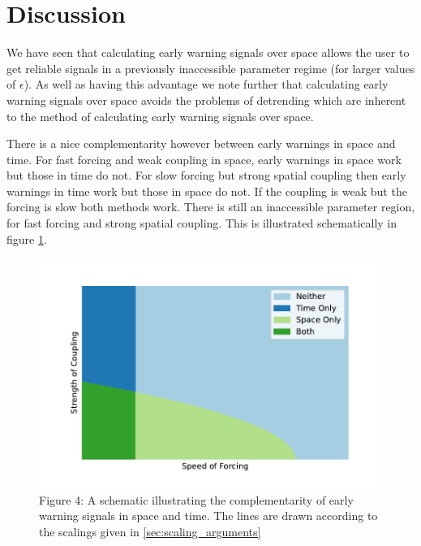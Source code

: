     \section{Discussion}
     We have seen that calculating early warning signals over space allows the user to get reliable
    signals in a previously inaccessible parameter regime (for larger values of $\epsilon$).  As well
    as having this advantage we note further that calculating early warning signals over space avoids 
    the problems of detrending which are inherent to the method of calculating early warning signals over
    space.

    There is a nice complementarity however between early warnings in space and time. For fast forcing
    and weak coupling in space, early warnings in space work but those in time do not. For slow forcing
    but strong spatial coupling then early warnings in time work but those in space do not. If the
    coupling is weak but the forcing is slow both methods work. There is still an inaccessible parameter
    region, for fast forcing and strong spatial coupling. This is illustrated schematically in figure
    \cref{fig:idealised_plot}.
    \begin{figure}
      \centering
      \includegraphics[width=\textwidth,keepaspectratio]{idealised_plot}
      \caption[A schematic showing the complementarity of spatial and temporal early warning signals]{Figure 4: A schematic illustrating the complementarity of early warning signals in space and time.
        The lines are drawn according to the scalings given in \cref{sec:scaling_arguments}}
        \label{fig:idealised_plot}
    \end{figure}

